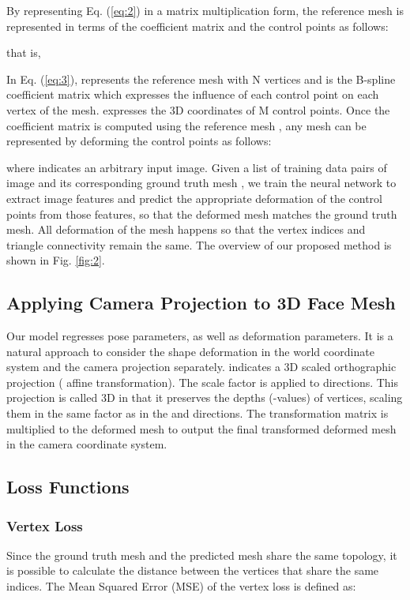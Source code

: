 \documentclass[letterpaper, 10 pt, conference]{ieeeconf}
\begin{document}
By representing Eq. (\ref{eq:2}) in a matrix multiplication form, the reference mesh  is represented in terms of the coefficient matrix  and the control points  as follows:


that is,

\small
\normalsize
In Eq. (\ref{eq:3}),  represents the reference mesh with N vertices and  is the B-spline coefficient matrix which expresses the influence of each control point on each vertex of the mesh.  expresses the 3D coordinates of M control points. 
Once the coefficient matrix  is computed using the reference mesh , any mesh  can be represented by deforming the control points as follows:


where  indicates an arbitrary input image. Given a list of training data pairs of image  and its corresponding ground truth mesh , we train the neural network to extract image features and predict the appropriate deformation  of the control points from those features, so that the deformed mesh  matches the ground truth mesh. All deformation of the mesh happens so that the vertex indices and triangle connectivity remain the same. The overview of our proposed method is shown in Fig. \ref{fig:2}.


\subsection{Applying Camera Projection to 3D Face Mesh}
Our model regresses pose parameters, as well as deformation parameters. It is a natural approach to consider the shape deformation in the world coordinate system and the camera projection separately.  indicates a 3D scaled orthographic projection ( affine transformation). The scale factor  is applied to  directions. This projection is called 3D in that it preserves the depths (-values) of vertices, scaling them in the same factor as in the  and  directions. The transformation matrix  is multiplied to the deformed mesh to output the final transformed deformed mesh in the camera coordinate system. 


\subsection{Loss Functions}

\subsubsection{Vertex Loss}
Since the ground truth mesh and the predicted mesh share the same topology, it is possible to calculate the distance between the vertices that share the same indices. The Mean Squared Error (MSE) of the vertex loss is defined as: 
\end{document}
